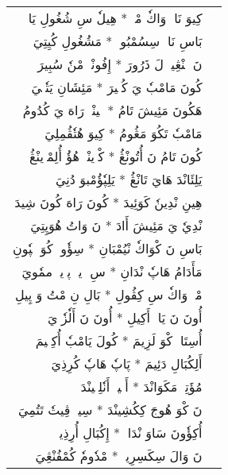 \documentclass[a4paper, 12pt]{report}
\begin{document}
\begin{longtable}{rl}
\textarabic{كِيوَ نَاوٖ وَاكٗ مْكٖ  *  هِيلٗ سِ شُغُولِ يَاكٖ} & \\ 
\textarabic{بَاسِ نَاوٖ سِسُمْبُوكٖ  *  مَشُغُولِ كُيِتِيَ} & \\ 
[8mm] 

\textarabic{نَ لٖنْڠِينٖ لَ ذَرُورَ  *  إِفُونْدٖ مْنٗ سُبِيرَ} & \\ 
\textarabic{كُونَ مَامْبٗ يَ كُكٖيرَ  *  مَئِشَانِ يَتٗكٖيَ} & \\ 
[8mm] 

\textarabic{هَكُونَ مَئِيشَ تَامُ  *  يٖينْيٖ رَاهَ يَ كُدُومُ} & \\ 
\textarabic{مَامْبٗ تَكُوَ مَڠُومُ  *  كِيوَ هُتٗڤُمِلِيَ} & \\ 
[8mm] 

\textarabic{كُونَ تَامُ نَ أُتُونْڠُ  *  كْوٖينْيٖ هُؤُ أُلِمْوٖينْڠُ} & \\ 
\textarabic{يَلِئَانْدَ هَايَ تَانْڠُ  *  يَلِپٗؤُمْبوَ دُنِيَ} & \\ 
[8mm] 

\textarabic{هِينِ نْدِينٗ كَوَئِيدَ  *  كُونَ رَاهَ كُونَ شِيدَ} & \\ 
\textarabic{نْدِيٗ يَ مَئِيشَ أَادَ  *  نَ وَاتُ هُوَپِتِيَ} & \\ 
[8mm] 

\textarabic{بَاسِ نَ كْوَاكٗ نْيُمْبَانِ  *  سِؤٗوتٖ كُوَ پٖپٗونِ} & \\ 
\textarabic{مَأَدَامُ هَاپٗ نْدَانِ  *  سِ وٖيوٖ پوٖيكٖ ممٗويَ} & \\ 
[8mm] 

\textarabic{مْكٖ وَاكٗ سِ كِڤُولِ  *  بَالِ نِ مْتُ وَ پِيلِ} & \\ 
\textarabic{أُونَ نَ يَاكٖ أَكِيلِ  *  أُونَ نَ أَلٗزٗوٖيَ} & \\ 
[8mm] 

\textarabic{أُسِتَاكٖ كْوَ لَزِيمَ  *  كُولَ يَامْبٗ أُكِسٖيمَ} & \\ 
\textarabic{أَلِكُبَالِ دَئِيمَ  *  پَاپٗ هَاپٗ كُرِذِيَ} & \\ 
[8mm] 

\textarabic{مُؤَتِيٖ مَكَوَانْدَ  *  أَنٖينٖ أَنٗلِپٖينْدَ} & \\ 
\textarabic{نَ كْوَ هُوجَ كِكُشِينْدَ  *  سِيوٖ ڤِيتٗ تَتُمِيَ} & \\ 
[8mm] 

\textarabic{أُكِؤٗونَ سَاوَ نْدَاكٖ  *  إِكُبَالِ أُرِذِيكٖ} & \\ 
\textarabic{نَ وَالَ سِكَسِرِيكٖ  *  مْدٗومٗ كُمْفُنْڠِيَ} & \\ 
[8mm] 


\end{longtable}
\end{document}
